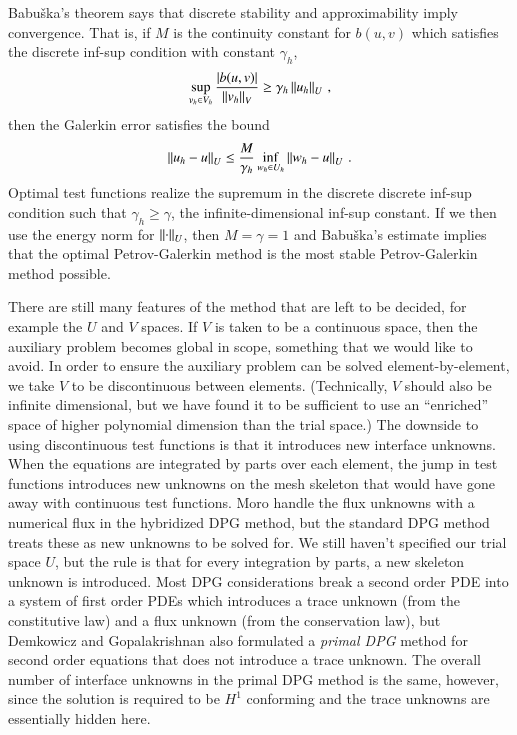 \documentclass[preprint,12pt]{elsarticle}
\begin{document}
Babu\v{s}ka's theorem\cite{Babuska70} says that discrete stability and approximability imply convergence.
That is, if $M$ is the continuity constant for $b(u,v)$ which satisfies the discrete inf-sup condition with constant $\gamma_h$,
\[
\sup_{v_h\in V_h}\frac{|b(u,v)|}{\left\| v_h \right\|_V}\geq\gamma_h\left\| u_h \right\|_U\,,
\]
then the Galerkin error satisfies the bound
\[
\left\| u_h-u \right\|_U\leq\frac{M}{\gamma_h}\inf_{w_h\in U_h}\left\| w_h-u \right\|_U\,.
\]
Optimal test functions realize the supremum in the discrete discrete inf-sup condition such that $\gamma_h\geq\gamma$, 
the infinite-dimensional inf-sup constant.
If we then use the energy norm for $\left\| \cdot \right\|_U$, then $M=\gamma=1$ and Babu\v{s}ka's estimate implies that
the optimal Petrov-Galerkin method is the most stable Petrov-Galerkin method possible.

There are still many features of the method that are left to be decided, for example the $U$ and $V$ spaces.
If $V$ is taken to be a continuous space, then the auxiliary problem becomes global in scope, something that we would like to avoid.
In order to ensure the auxiliary problem can be solved element-by-element, we take $V$ to be discontinuous between elements.
(Technically, $V$ should also be infinite dimensional, but we have found it to be sufficient to use an ``enriched'' space of higher
polynomial dimension than the trial space\cite{PracticalDPG}.)
The downside to using discontinuous test functions is that it introduces new interface unknowns.
When the equations are integrated by parts over each element, the jump in test functions introduces new unknowns on the mesh skeleton
that would have gone away with continuous test functions.
Moro \etal\cite{MoroNguyenPeraire11} handle the flux unknowns with a numerical flux in the hybridized DPG method, but the standard DPG method treats
these as new unknowns to be solved for.
We still haven't specified our trial space $U$, but the rule is that for every integration by parts, a new skeleton unknown is introduced.
Most DPG considerations break a second order PDE into a system of first order PDEs which introduces a trace unknown (from the constitutive law) 
and a flux unknown (from the conservation law), but Demkowicz and Gopalakrishnan also formulated a \emph{primal DPG} method for second order equations
that does not introduce a trace unknown.
The overall number of interface unknowns in the primal DPG method is the same, however, since the solution is required to be $H^1$ conforming 
and the trace unknowns are essentially hidden here.
\end{document}
